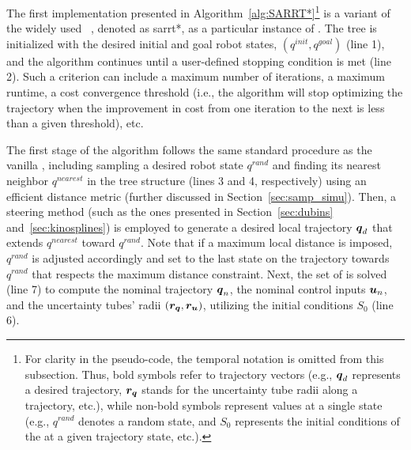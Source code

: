 
The first implementation presented in Algorithm~\ref{alg:SARRT*}\footnote{For clarity in the pseudo-code, the temporal notation is omitted from this subsection. 
Thus, bold symbols refer to trajectory vectors (e.g., $\boldsymbol{q}_d$ represents a desired trajectory, $\boldsymbol{r_q}$ stands for the uncertainty tube radii along a trajectory, etc.), while non-bold symbols represent values at a single state (e.g., $q^{rand}$ denotes a random state, and $S_0$ represents the initial conditions of the  at a given trajectory state, etc.).} is a variant of the widely used ~\cite{cRRTstar}, denoted as \gls{sarrt*}, as a particular instance of .
The tree is initialized with the desired initial and goal robot states, $(q^{init}, q^{goal})$ (line 1), and the algorithm continues until a user-defined stopping condition is met (line 2).
Such a criterion can include a maximum number of iterations, a maximum runtime, a cost convergence threshold (i.e., the algorithm will stop optimizing the trajectory when the improvement in cost from one iteration to the next is less than a given threshold), etc.

The first stage of the algorithm follows the same standard procedure as the vanilla , including sampling a desired robot state $q^{rand}$ and finding its nearest neighbor $q^{nearest}$ in the tree structure (lines 3 and 4, respectively) using an efficient distance metric (further discussed in Section~\ref{sec:samp_simu}).
Then, a steering method (such as the ones presented in Section~\ref{sec:dubins} and~\ref{sec:kinosplines}) is employed to generate a desired local trajectory $\boldsymbol{q}_d$ that extends $q^{nearest}$ toward $q^{rand}$.
Note that if a maximum local distance is imposed, $q^{rand}$ is adjusted accordingly and set to the last state on the trajectory towards $q^{rand}$ that respects the maximum distance constraint.
Next, the set of  is solved (line 7) to compute the nominal trajectory $\boldsymbol{q}_n$, the nominal control inputs $\boldsymbol{u}_n$, and the uncertainty tubes' radii $(\boldsymbol{r_q}, \boldsymbol{r_u})$, utilizing the initial conditions $S_0$ (line 6).

